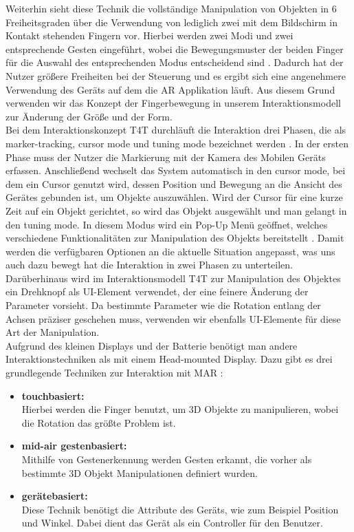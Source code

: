 \documentclass[12pt,a4paper, oneside]{scrartcl}
\begin{document}
Weiterhin sieht diese Technik die vollständige Manipulation von Objekten in 6 Freiheitsgraden über die Verwendung von lediglich zwei mit dem Bildschirm in Kontakt stehenden Fingern vor. Hierbei werden zwei Modi und zwei entsprechende Gesten eingeführt, wobei die Bewegungsmuster der beiden Finger für die Auswahl des entsprechenden Modus entscheidend sind \cite{liu_2012}. Dadurch hat der Nutzer größere Freiheiten bei der Steuerung und es ergibt sich eine angenehmere Verwendung des Geräts auf dem die AR Applikation läuft. Aus diesem Grund verwenden wir das Konzept der Fingerbewegung in unserem Interaktionsmodell zur Änderung der Größe und der Form. \\
Bei dem Interaktionskonzept T4T durchläuft die Interaktion drei Phasen, die als marker-tracking, cursor mode und tuning mode bezeichnet werden \cite{cannavo_2020}.
In der ersten Phase muss der Nutzer die Markierung mit der Kamera des Mobilen Geräts erfassen. Anschließend wechselt das System automatisch in den cursor mode, bei dem ein Cursor genutzt wird, dessen Position und Bewegung an die Ansicht des Gerätes gebunden ist, um Objekte auszuwählen. Wird der Cursor für eine kurze Zeit auf ein Objekt gerichtet, so wird das Objekt ausgewählt und man gelangt in den tuning mode. In diesem Modus wird ein Pop-Up Menü geöffnet, welches verschiedene Funktionalitäten zur Manipulation des Objekts bereitstellt \cite{cannavo_2017}. Damit werden die verfügbaren Optionen an die aktuelle Situation angepasst, was uns auch dazu bewegt hat die Interaktion in zwei Phasen zu unterteilen. 
Darüberhinaus wird im Interaktionsmodell T4T zur Manipulation des Objektes ein Drehknopf als UI-Element verwendet, der eine feinere Änderung der Parameter vorsieht. Da bestimmte Parameter wie die Rotation entlang der Achsen präziser geschehen muss, verwenden wir ebenfalls UI-Elemente für diese Art der Manipulation. \\
Aufgrund des kleinen Displays und der Batterie benötigt man andere Interaktionstechniken als mit einem Head-mounted Display. Dazu gibt es drei grundlegende Techniken zur Interaktion mit MAR \cite{goh_sunar_ismail_2019}: 
\begin{itemize}
\item \textbf{touchbasiert:} \\
Hierbei werden die Finger benutzt, um 3D Objekte zu manipulieren, wobei die Rotation das größte Problem ist. 
\item \textbf{mid-air gestenbasiert:} \\
Mithilfe von Gestenerkennung werden Gesten erkannt, die vorher als bestimmte 3D Objekt Manipulationen definiert wurden. 
\item \textbf{gerätebasiert:} \\
Diese Technik benötigt die Attribute des Geräts, wie zum Beispiel Position und Winkel. Dabei dient das Gerät als ein Controller für den Benutzer. 
\end{itemize}
\end{document}
